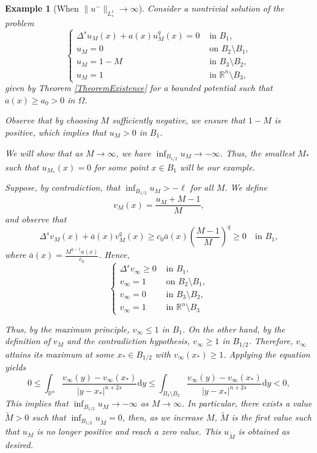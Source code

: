 \documentclass[11pt]{article}
\newcommand{\R}{\mathbb{R}}
\newtheorem{example}{Example}
\begin{document}
\begin{example}[When \(\|u^-\|_{L^1_s}\rightarrow \infty\)]\label{counterexample}
Consider a nontrivial solution of the problem
\begin{equation*}
\begin{cases}
    \Delta^su_M(x) + a(x)u_M^{q}(x) = 0 & \text{ in } B_1, \\ 
    u_M=0 & \text{ on }B_2\setminus B_1,\\
    u_M= 1-M & \text{ in } B_3\setminus B_2, \\
    u_M=1  & \text{ in } \R^n\setminus B_3,
\end{cases}
\end{equation*}
given by Theorem \ref{TheoremExistence} for a bounded potential such that $a(x)\geq a_0>0$ in $\Omega$.

Observe that by choosing $M$ sufficiently negative, we ensure that \(1-M\) is positive, which implies that $u_{M}>0$ in $B_1$. 

We will show that as $M\rightarrow \infty$, we have $\inf_{B_{1/2}} u_M\rightarrow -\infty$. Thus, the smallest $M_*$ such that $u_{M_*}(x)=0$ for some point $x\in B_1$ will be our example.

Suppose, by contradiction, that $\inf_{B_{1/2}} u_M > -\ell$ for all $M$. We define
\[
v_M(x)=\frac{u_M+M-1}{M},
\]
and observe that
\[
\Delta^s v_M(x) + \bar{a}(x)v_M^{q}(x) \geq c_0\bar{a}(x)\left(\frac{M-1}{M}\right)^q \geq 0 \quad \text{in } B_1,
\]
where $\bar{a}(x)=\frac{M^{q-1}a(x)}{c_0}$. Hence,
\begin{equation*}
\begin{cases}
    \Delta^s v_\infty \geq  0 & \text{ in } B_1, \\ 
    v_\infty = 1 & \text{ on } B_2\setminus B_1,\\
    v_\infty = 0 & \text{ in } B_3\setminus B_2, \\
    v_\infty = 1 & \text{ in } \R^n\setminus B_3
\end{cases}
\end{equation*}

Thus, by the maximum principle, $v_\infty \leq 1$ in $B_1$. On the other hand, by the definition of $v_M$ and the contradiction hypothesis, $v_\infty \geq 1$ in $B_{1/2}$. Therefore, $v_\infty$ attains its maximum at some $x_*\in B_{1/2}$ with $v_\infty(x_*)\geq 1$. Applying the equation yields
\[
0 \leq \int_{\R^n}\frac{v_\infty(y)-v_\infty(x_*)}{|y-x_*|^{n+2s}}\mathrm{d}y \leq \int_{B_3\setminus B_2}\frac{v_\infty(y)-v_\infty(x_*)}{|y-x_*|^{n+2s}}\mathrm{d}y < 0,
\]
This implies that \(\inf_{B_{1/2}}u_{M}\to -\infty\) as \(M\to\infty\). In particular, there exists a value \(\widetilde{M}>0\) such that \(\inf_{B_{1/2}}u_{\widetilde{M}}=0\), then, as we increase \(M\), \(\widetilde{M}\) is the first value such that \(u_{M}\) is no longer positive and reach a zero value. This \(u_{\widetilde{M}}\) is obtained as desired.
\end{example}
\end{document}
